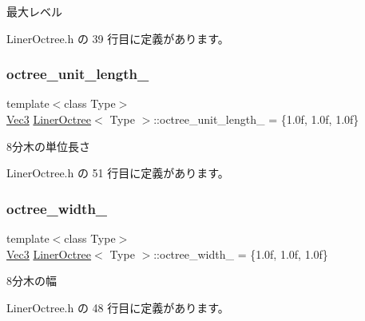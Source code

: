 最大レベル 



 Liner\+Octree.\+h の 39 行目に定義があります。

\mbox{\label{class_liner_octree_af412add67f71dd8ceb8af82be6015988}} 
\subsubsection{\texorpdfstring{octree\+\_\+unit\+\_\+length\+\_\+}{octree\_unit\_length\_}}
{\footnotesize\ttfamily template$<$class Type$>$ \\
\mbox{\hyperlink{_vector3_d_8h_ab16f59e4393f29a01ec8b9bbbabbe65d}{Vec3}} \mbox{\hyperlink{class_liner_octree}{Liner\+Octree}}$<$ Type $>$\+::octree\+\_\+unit\+\_\+length\+\_\+ = \{1.\+0f, 1.\+0f, 1.\+0f\}\hspace{0.3cm}{\ttfamily [private]}}



8分木の単位長さ 



 Liner\+Octree.\+h の 51 行目に定義があります。

\mbox{\label{class_liner_octree_accf45495e9a4cbf5ed3d8a839eda9806}} 
\subsubsection{\texorpdfstring{octree\+\_\+width\+\_\+}{octree\_width\_}}
{\footnotesize\ttfamily template$<$class Type$>$ \\
\mbox{\hyperlink{_vector3_d_8h_ab16f59e4393f29a01ec8b9bbbabbe65d}{Vec3}} \mbox{\hyperlink{class_liner_octree}{Liner\+Octree}}$<$ Type $>$\+::octree\+\_\+width\+\_\+ = \{1.\+0f, 1.\+0f, 1.\+0f\}\hspace{0.3cm}{\ttfamily [private]}}



8分木の幅 



 Liner\+Octree.\+h の 48 行目に定義があります。

